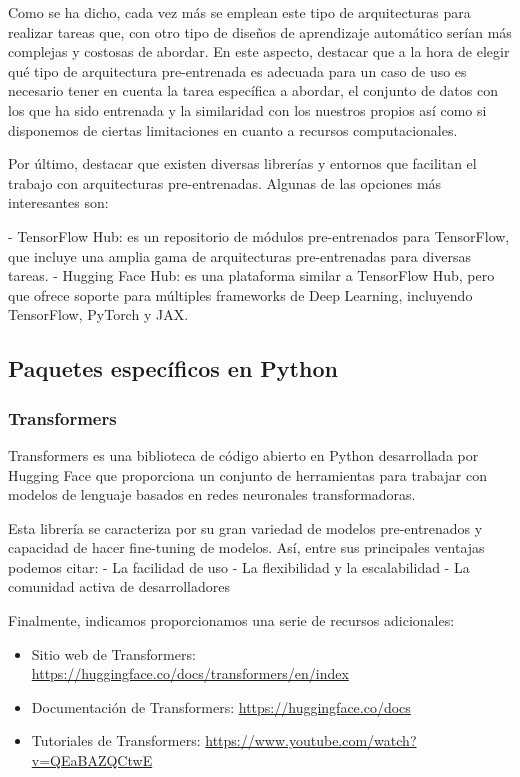 \documentclass[
  a4paper,
  DIV=11,
  numbers=noendperiod]{scrreprt}
\providecommand{\tightlist}{%
  \setlength{\itemsep}{0pt}\setlength{\parskip}{0pt}}\usepackage{longtable,booktabs,array}
\begin{document}
Como se ha dicho, cada vez más se emplean este tipo de arquitecturas
para realizar tareas que, con otro tipo de diseños de aprendizaje
automático serían más complejas y costosas de abordar. En este aspecto,
destacar que a la hora de elegir qué tipo de arquitectura pre-entrenada
es adecuada para un caso de uso es necesario tener en cuenta la tarea
específica a abordar, el conjunto de datos con los que ha sido entrenada
y la similaridad con los nuestros propios así como si disponemos de
ciertas limitaciones en cuanto a recursos computacionales.

Por último, destacar que existen diversas librerías y entornos que
facilitan el trabajo con arquitecturas pre-entrenadas. Algunas de las
opciones más interesantes son:

- TensorFlow Hub: es un repositorio de módulos pre-entrenados para
TensorFlow, que incluye una amplia gama de arquitecturas pre-entrenadas
para diversas tareas. - Hugging Face Hub: es una plataforma similar a
TensorFlow Hub, pero que ofrece soporte para múltiples frameworks de
Deep Learning, incluyendo TensorFlow, PyTorch y JAX.

\subsection{Paquetes específicos en
Python}\label{paquetes-especuxedficos-en-python}

\subsubsection{Transformers}\label{transformers}

Transformers es una biblioteca de código abierto en Python desarrollada
por Hugging Face que proporciona un conjunto de herramientas para
trabajar con modelos de lenguaje basados en redes neuronales
transformadoras.

Esta librería se caracteriza por su gran variedad de modelos
pre-entrenados y capacidad de hacer fine-tuning de modelos. Así, entre
sus principales ventajas podemos citar: - La facilidad de uso - La
flexibilidad y la escalabilidad - La comunidad activa de desarrolladores

Finalmente, indicamos proporcionamos una serie de recursos adicionales:

\begin{itemize}
\tightlist
\item
  Sitio web de Transformers:
  \url{https://huggingface.co/docs/transformers/en/index}
\item
  Documentación de Transformers: \url{https://huggingface.co/docs}
\item
  Tutoriales de Transformers:
  \url{https://www.youtube.com/watch?v=QEaBAZQCtwE}
\end{itemize}
\end{document}
